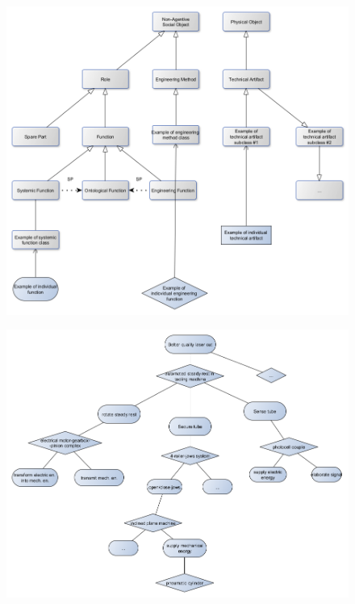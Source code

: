 \documentclass[
]{ceurart}
\begin{document}
\begin{figure}
  \centering
  \includegraphics[width=\textwidth]{class-taxonomy.png}
  \caption{\label{fig:class-taxonomy}}
\end{figure}
\begin{figure}
  \centering
  \includegraphics[width=\textwidth]{functional-decomposition.png}
  \caption{\label{fig:functional-decomposition}}
\end{figure}
\end{document}
